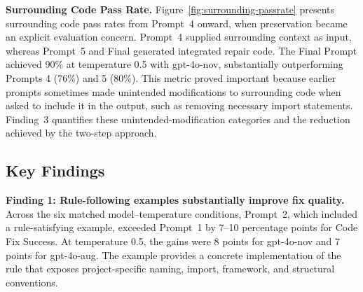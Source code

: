\textbf{Surrounding Code Pass Rate.} Figure~\ref{fig:surrounding-passrate} presents surrounding code pass
rates from Prompt~4 onward, when preservation became an explicit
evaluation concern. Prompt~4 supplied surrounding context as input,
whereas Prompt~5 and Final generated integrated repair code. The Final Prompt achieved 90\% at temperature 0.5 with gpt-4o-nov, substantially outperforming Prompts 4 (76\%) and 5 (80\%).
This metric proved important because earlier prompts sometimes made unintended modifications to surrounding code when asked to include it in the output, such as removing necessary import statements. Finding~3 quantifies these unintended-modification categories and the reduction achieved by the two-step approach.


\subsection{Key Findings}
\label{sec:evaluation-one-findings}
\textbf{Finding 1: Rule-following examples substantially improve fix
quality.} Across the six matched model--temperature conditions,
Prompt~2, which included a rule-satisfying example, exceeded Prompt~1
by 7--10 percentage points for Code Fix Success. At temperature 0.5,
the gains were 8 points for gpt-4o-nov and 7 points for gpt-4o-aug.
The example provides a concrete implementation of the rule that exposes
project-specific naming, import, framework, and structural conventions.

